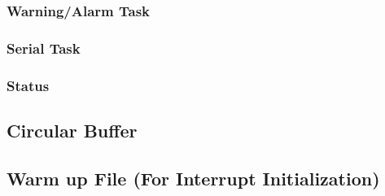 \documentclass[12pt]{article} %
\begin{document}
    \subsubsection{Warning/Alarm Task}
    
    

    \subsubsection{Serial Task}
    
    

    \subsubsection{Status}
    
    

    \subsection{Circular Buffer}
    
    

    \subsection{Warm up File (For Interrupt Initialization)}
    

    
\end{document}
